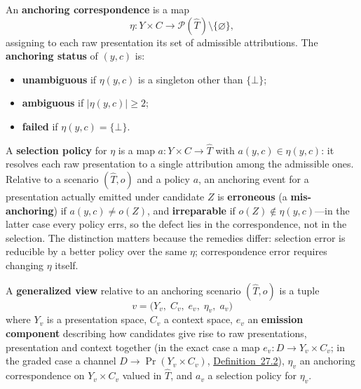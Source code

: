 \begin{thmdef}

An \textbf{anchoring correspondence} is a map
\[
\eta : Y \times C \longrightarrow \mathcal{P}(\widehat{T}) \setminus \{\varnothing\},
\]
assigning to each raw presentation its set of admissible attributions. The \textbf{anchoring status} of \((y,c)\) is:

\begin{itemize}
\tightlist
\item
  \textbf{unambiguous} if \(\eta(y,c)\) is a singleton other than \(\{\bot\}\);
\item
  \textbf{ambiguous} if \(|\eta(y,c)| \ge 2\);
\item
  \textbf{failed} if \(\eta(y,c) = \{\bot\}\).
\end{itemize}
\end{thmdef}

\begin{thmdef}

A \textbf{selection policy} for \(\eta\) is a map \(a : Y \times C \to \widehat{T}\) with \(a(y,c) \in \eta(y,c)\): it resolves each raw presentation to a single attribution among the admissible ones. Relative to a scenario \((\widehat{T}, o)\) and a policy \(a\), an anchoring event for a presentation actually emitted under candidate \(Z\) is \textbf{erroneous} (a \textbf{mis-anchoring}) if \(a(y,c) \ne o(Z)\), and \textbf{irreparable} if \(o(Z) \notin \eta(y,c)\)---\hspace{0pt}in the latter case every policy errs, so the defect lies in the correspondence, not in the selection. The distinction matters because the remedies differ: selection error is reducible by a better policy over the same \(\eta\); correspondence error requires changing \(\eta\) itself.
\end{thmdef}

\begin{thmdef}

A \textbf{generalized view} relative to an anchoring scenario \((\widehat{T}, o)\) is a tuple
\[
v = \big( Y_v,\; C_v,\; e_v,\; \eta_v,\; a_v \big)
\]
where \(Y_v\) is a presentation space, \(C_v\) a context space, \(e_v\) an \textbf{emission component} describing how candidates give rise to raw presentations, presentation and context together (in the exact case a map \(e_v : D \to Y_v \times C_v\); in the graded case a channel \(D \to \Pr(Y_v \times C_v)\), \hyperlink{stmt:27.2}{Definition~27.2}), \(\eta_v\) an anchoring correspondence on \(Y_v \times C_v\) valued in \(\widehat{T}\), and \(a_v\) a selection policy for \(\eta_v\).
\end{thmdef}

